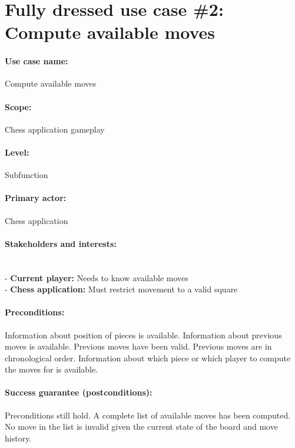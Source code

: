 \documentclass{article}
\begin{document}
\section{Fully dressed use case \#2: Compute available moves}

\paragraph{Use case name:} Compute available moves

\paragraph{Scope:} Chess application gameplay

\paragraph{Level:} Subfunction

\paragraph{Primary actor:} Chess application

\paragraph{Stakeholders and interests:}\mbox{}\\
- \textbf{Current player:} Needs to know available moves\\
- \textbf{Chess application:} Must restrict movement to a valid square\\

\paragraph{Preconditions:} Information about position of pieces is available. Information about previous moves is available. Previous moves have been valid. Previous moves are in chronological order. Information about which piece or which player to compute the moves for is available.

\paragraph{Success guarantee (postconditions):} Preconditions still hold. A complete list of available moves has been computed. No move in the list is invalid given the current state of the board and move history.
\end{document}
